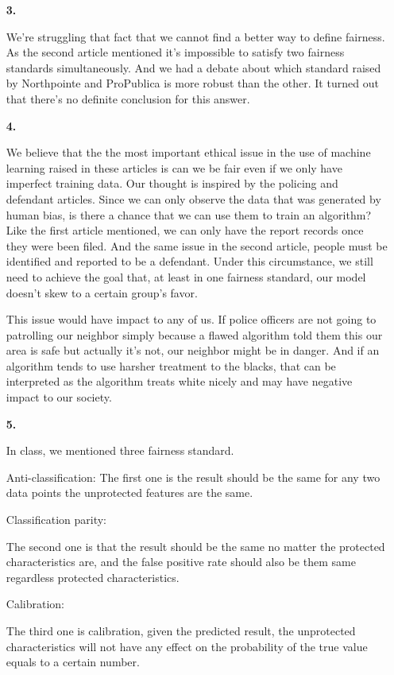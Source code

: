 \documentclass[11pt]{article}
\begin{document}
\begin{enumerate}
\item[\textbf{3.}]

We're struggling that fact that we cannot find a better way to define fairness. As the second article mentioned it's impossible to satisfy two fairness standards simultaneously. And we had a debate about which standard raised by Northpointe and ProPublica is more robust than the other. It turned out that there's no definite conclusion for this answer.

\item[\textbf{4.}]

We believe that the the most important ethical issue in the use of machine learning raised in these articles is can we be fair even if we only have imperfect training data. Our thought is inspired by the policing and defendant articles. Since we can only observe the data that was generated by human bias, is there a chance that we can use them to train an algorithm? Like the first article mentioned, we can only have the report records once they were been filed. And the same issue in the second article, people must be identified and reported to be a defendant. Under this circumstance, we still need to achieve the goal that, at least in one fairness standard, our model doesn't skew to a certain group's favor. 

This issue would have impact to any of us. If police officers are not going to patrolling our neighbor simply because a flawed algorithm told them this our area is safe but actually it's not, our neighbor might be in danger. And if an algorithm tends to use harsher treatment to the blacks, that can be interpreted as the algorithm treats white nicely and may have negative impact to our society.

\item[\textbf{5.}]

In class, we mentioned three fairness standard. 

Anti-classification: The first one is the result should be the same for any two data points the unprotected features are the same. 

Classification parity:

The second one is that the result should be the same no matter the protected characteristics are, and the false positive rate should also be them same regardless protected characteristics. 

Calibration:

The third one is calibration, given the predicted result, the unprotected characteristics will not have any effect on the probability of the true value equals to a certain number.


\end{enumerate}
\end{document}
